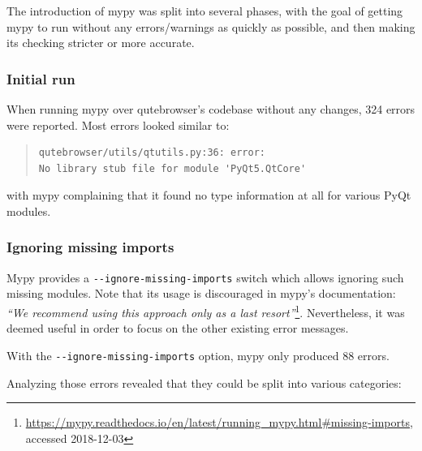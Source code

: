 \documentclass[a4paper,parskip=full,DIV=14,BCOR=15mm]{scrreprt}
\begin{document}
The introduction of mypy was split into several phases, with the goal of getting
mypy to run without any errors/warnings as quickly as possible, and then making
its checking stricter or more accurate.

\subsubsection{Initial run}
When running mypy over qutebrowser's codebase without any changes, 324 errors
were reported. Most errors looked similar to:

\begin{quote}
\begin{verbatim}
qutebrowser/utils/qtutils.py:36: error:
No library stub file for module 'PyQt5.QtCore'
\end{verbatim}
\end{quote}

with mypy complaining that it found no type information at all for various PyQt
modules.

\subsubsection{Ignoring missing imports}

Mypy provides a \verb|--ignore-missing-imports| switch which allows ignoring
such missing modules. Note that its usage is discouraged in mypy's documentation:
\emph{``We recommend using this approach only as a last resort''}\footnote{\url{https://mypy.readthedocs.io/en/latest/running_mypy.html\#missing-imports},
accessed 2018-12-03}. Nevertheless, it was deemed useful in order to focus on
the other existing error messages.

With the \verb|--ignore-missing-imports| option, mypy only produced 88 errors.

Analyzing those errors revealed that they could be split into various
categories:
\end{document}
